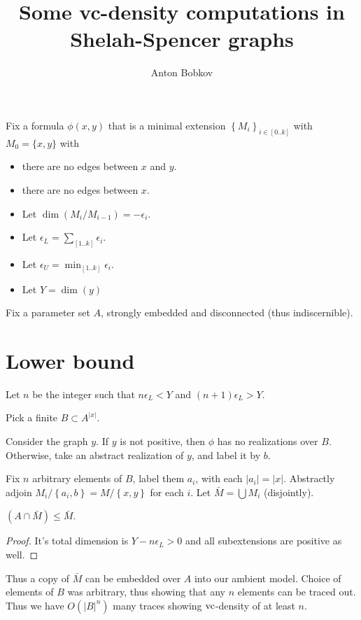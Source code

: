 \documentclass{amsart}
\title{Some vc-density computations in Shelah-Spencer graphs}
\author{Anton Bobkov}
\newcommand{\curly}[1]{\left\{#1\right\}}
\newcommand{\paren}[1]{\left(#1\right)}
\begin{document}
\maketitle

Fix a formula $\phi(x, y)$ that is a minimal extension $\curly{M_i}_{i \in [0..k]}$ with $M_0 = \{x, y\}$ with
\begin{itemize}
	\item there are no edges between $x$ and $y$.
	\item there are no edges between $x$.
	\item Let $\dim \paren{M_i/M_{i-1}} = -\epsilon_i$.
	\item Let $\epsilon_L = \sum_{[1..k]} \epsilon_i$.
	\item Let $\epsilon_U = \min_{[1..k]} \epsilon_i$.
	\item Let $Y = \dim (y)$
\end{itemize}

Fix a parameter set $A$, strongly embedded and disconnected (thus indiscernible).

\section*{Lower bound}

Let $n$ be the integer such that $n \epsilon_L < Y$ and $(n+1) \epsilon_L > Y$.

Pick a finite $B \subset A^{|x|}$.

Consider the graph $y$.
If $y$ is not positive, then $\phi$ has no realizations over $B$.
Otherwise, take an abstract realization of $y$, and label it by $b$.

Fix $n$ arbitrary elements of $B$, label them $a_i$, with each $|a_i| = |x|$.
Abstractly adjoin $M_i/\curly{a_i, b} = M/\curly{x,y}$ for each $i$.
Let $\bar M = \bigcup M_i$ (disjointly).

\begin{Claim}
	$(A \cap \bar M) \leq \bar M$.
\end{Claim}
\begin{proof}
	It's total dimension is $Y - n\epsilon_L > 0$ and all subextensions are positive as well.
\end{proof}

Thus a copy of $\bar M$ can be embedded over $A$ into our ambient model.
Choice of elements of $B$ was arbitrary, thus showing that any $n$ elements can be traced out.
Thus we have $O(|B|^n)$ many traces showing $\operatorname{vc}$-density of at least $n$.
\end{document}
